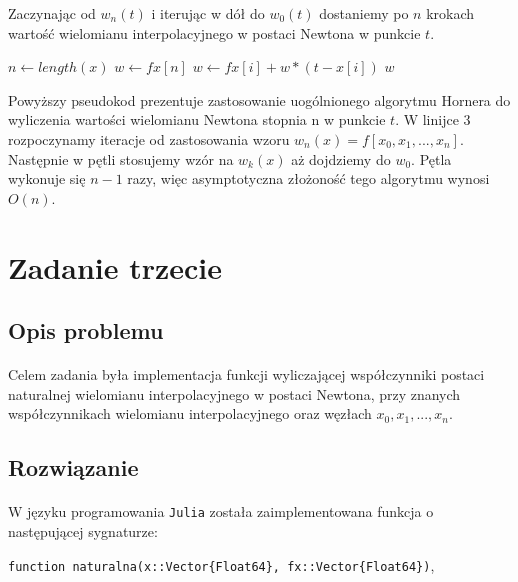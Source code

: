 \documentclass[a4paper]{article}
\theoremstyle{plain}
\begin{document}
Zaczynając od $w_{n}(t)$ i iterując w dół do $w_{0}(t)$ dostaniemy po $n$ krokach wartość wielomianu interpolacyjnego w postaci Newtona w punkcie $t$.

\begin{center}
	\begin{algorithmic}[1]
		\State $n \gets length(x)$
    	\State $w \gets fx[n]$
    		\State $w \gets fx[i] + w * (t - x[i])$
    	\EndFor
    	\State \Return $w$
	\EndFunction
	\end{algorithmic}
\end{center}

Powyższy pseudokod prezentuje zastosowanie uogólnionego algorytmu Hornera do wyliczenia wartości wielomianu Newtona stopnia n w punkcie $t$. W linijce 3 rozpoczynamy iteracje od zastosowania wzoru $w_{n}(x) = f[x_{0}, x_{1}, ..., x_{n}]$. Następnie w pętli stosujemy wzór na $w_{k}(x)$ aż dojdziemy do $w_{0}$. Pętla wykonuje się $n - 1$ razy, więc asymptotyczna złożoność tego algorytmu wynosi $O(n)$.
\clearpage

\section{Zadanie trzecie}

\subsection{Opis problemu}
\paragraph{}
Celem zadania była implementacja funkcji wyliczającej współczynniki postaci naturalnej wielomianu interpolacyjnego w postaci Newtona, przy znanych współczynnikach wielomianu interpolacyjnego oraz węzłach $x_{0}, x_{1}, ..., x_{n}$.

\subsection{Rozwiązanie}
\paragraph{}
W języku programowania \texttt{Julia} została zaimplementowana funkcja o następującej sygnaturze:
\begin{center}
\texttt{function naturalna(x::Vector\{Float64\}, fx::Vector\{Float64\})},
\end{center}
\end{document}
